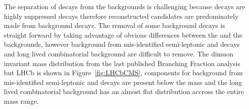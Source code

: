 The separation of \bsmumu decays from the backgrounds is challenging because \bsmumu decays are highly suppressed decays therefore reconstructed candidates are predominately made from background decays.
The removal of some background decays is straight forward by taking advantage of obvious differences between the \bsmumu and the backgrounds, however background from mis-identified semi-leptonic and \bhh decays and long lived combinatorial background are difficult to remove. The dimuon invariant mass distribution from the last published \bmumu Branching Fraction analysis but LHCb is shown in Figure~\ref{fig:LHCbCMS}, components for background from mis-identified semi-leptonic and \bhh decays are present below the \bs mass and the long lived combinatorial background has an almost flat distribution accross the entire mass range. 


